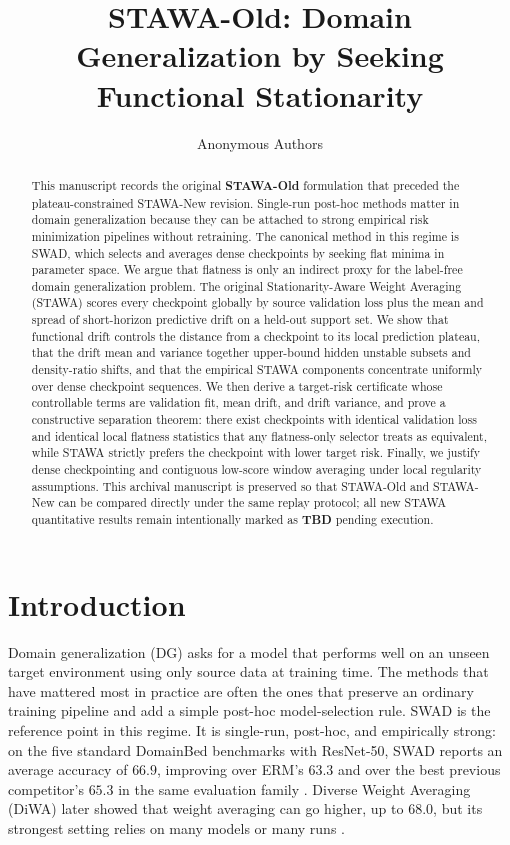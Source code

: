 \documentclass{article}
\title{STAWA-Old: Domain Generalization by Seeking Functional Stationarity}
\author{Anonymous Authors}
\newcommand{\TBD}{\textbf{TBD}}
\newcommand{\stawa}{\textup{\textsc{STAWA}}}
\newcommand{\swad}{\textup{\textsc{SWAD}}}
\begin{document}
\maketitle

\begin{abstract}
This manuscript records the original \textbf{STAWA-Old} formulation that preceded the plateau-constrained STAWA-New revision. Single-run post-hoc methods matter in domain generalization because they can be attached to strong empirical risk minimization pipelines without retraining. The canonical method in this regime is \swad, which selects and averages dense checkpoints by seeking flat minima in parameter space. We argue that flatness is only an indirect proxy for the label-free domain generalization problem. The original Stationarity-Aware Weight Averaging (\stawa) scores every checkpoint globally by source validation loss plus the mean and spread of short-horizon predictive drift on a held-out support set. We show that functional drift controls the distance from a checkpoint to its local prediction plateau, that the drift mean and variance together upper-bound hidden unstable subsets and density-ratio shifts, and that the empirical \stawa{} components concentrate uniformly over dense checkpoint sequences. We then derive a target-risk certificate whose controllable terms are validation fit, mean drift, and drift variance, and prove a constructive separation theorem: there exist checkpoints with identical validation loss and identical local flatness statistics that any flatness-only selector treats as equivalent, while \stawa{} strictly prefers the checkpoint with lower target risk. Finally, we justify dense checkpointing and contiguous low-score window averaging under local regularity assumptions. This archival manuscript is preserved so that STAWA-Old and STAWA-New can be compared directly under the same replay protocol; all new \stawa{} quantitative results remain intentionally marked as \TBD{} pending execution.
\end{abstract}

\section{Introduction}

Domain generalization (DG) asks for a model that performs well on an unseen target environment using only source data at training time. The methods that have mattered most in practice are often the ones that preserve an ordinary training pipeline and add a simple post-hoc model-selection rule. \swad{} \citep{cha2021wad} is the reference point in this regime. It is single-run, post-hoc, and empirically strong: on the five standard DomainBed benchmarks with ResNet-50, \swad{} reports an average accuracy of $66.9$, improving over ERM's $63.3$ and over the best previous competitor's $65.3$ in the same evaluation family \citep{cha2021wad}. Diverse Weight Averaging (DiWA) later showed that weight averaging can go higher, up to $68.0$, but its strongest setting relies on many models or many runs \citep{rame2022diwa}.
\end{document}
